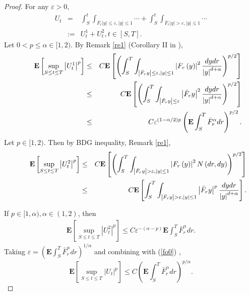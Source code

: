 \documentclass[11pt]{amsart}
\theoremstyle{plain}
\numberwithin{equation}{section}
\begin{document}
\begin{proof}
For any $\varepsilon >0,$\begin{eqnarray*}
U_{t} &=&\int_{S}^{t}\int_{\bar{F}_{r}\left\vert y\right\vert \leq
\varepsilon ,\left\vert y\right\vert \leq 1}\cdots +\int_{S}^{t}\int_{\bar{F}_{r}\left\vert y\right\vert >\varepsilon ,\left\vert y\right\vert \leq
1}\cdots \\
&:=&U_{t}^{1}+U_{t}^{2},t\in \left[ S,T\right] .
\end{eqnarray*}Let $0<p\leq \alpha \in \lbrack 1,2)$. By Remark \ref{re1} (Corollary II in 
\cite{le}), 
\begin{eqnarray}
\mathbf{\qquad }\mathbf{E}\left[ \sup_{S\leq t\leq T}\left\vert
U_{t}^{1}\right\vert ^{p}\right] &\leq &C\mathbf{E}\left[ \left(
\int_{S}^{T}\int_{\left\vert \bar{F}_{r}y\right\vert \leq \varepsilon
,\left\vert y\right\vert \leq 1}\left\vert F_{r}\left( y\right) \right\vert
^{2}\frac{dydr}{\left\vert y\right\vert ^{d+\alpha }}\right) ^{p/2}\right] 
\notag \\
&\leq &C\mathbf{E}\left[ \left( \int_{S}^{T}\int_{\left\vert \bar{F}_{r}y\right\vert \leq \varepsilon }\left\vert \bar{F}_{r}y\right\vert ^{2}\frac{dydr}{\left\vert y\right\vert ^{d+\alpha }}\right) ^{p/2}\right]
\label{fo0} \\
&\leq &C\varepsilon ^{\left( 1-\alpha /2\right) p}\left( \mathbf{E}\int_{S}^{T}\bar{F}_{r}^{\alpha }dr\right) ^{p/2}.  \notag
\end{eqnarray}Let $p\in \lbrack 1,2)$. Then by BDG inequality, Remark \ref{re1}, 
\begin{eqnarray}
\mathbf{\qquad }\mathbf{E}\left[ \sup_{S\leq t\leq T}\left\vert
U_{t}^{2}\right\vert ^{p}\right] &\leq &C\mathbf{E}\left[ \left(
\int_{S}^{T}\int_{\left\vert \bar{F}_{r}y\right\vert >\varepsilon
,\left\vert y\right\vert \leq 1}\left\vert F_{r}\left( y\right) \right\vert
^{2}N\left( dr,dy\right) \right) ^{p/2}\right]  \notag \\
&\leq &C\mathbf{E}\left[ \int_{S}^{T}\int_{\left\vert \bar{F}_{r}y\right\vert >\varepsilon ,\left\vert y\right\vert \leq 1}\left\vert 
\bar{F}_{r}y\right\vert ^{p}\frac{dydr}{\left\vert y\right\vert ^{d+\alpha }}\right] .  \label{fo1}
\end{eqnarray}

If $p\in \lbrack 1,\alpha ),\alpha \in \left( 1,2\right) $, then 
\begin{eqnarray*}
\mathbf{E}\left[ \sup_{S\leq t\leq T}\left\vert U_{t}^{2}\right\vert ^{p}\right]\leq C\varepsilon ^{-\left( \alpha -p\right) }\mathbf{E}\int_{S}^{T}\bar{F}_{r}^{\alpha }dr.
\end{eqnarray*}Taking $\varepsilon =\left( \mathbf{E}\int_{S}^{T}\bar{F}_{r}^{\alpha
}dr\right) ^{1/\alpha }$ and combining with (\ref{fo0}) , 
\begin{equation}
\mathbf{E}\left[ \sup_{S\leq t\leq T}\left\vert U_{t}\right\vert ^{p}\right]
\leq C\left( \mathbf{E}\int_{S}^{T}\bar{F}_{r}^{\alpha }dr\right) ^{p/\alpha
}.  \label{fo2}
\end{equation}


\end{proof}
\end{document}
